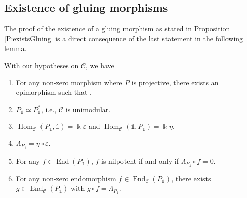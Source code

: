 \documentclass[pdftex]{sigma}
\numberwithin{equation}{section}
\newcommand{\tto}{\xrightarrow}
\numberwithin{theorem}{section}
\numberwithin{proposition}{section}
\numberwithin{definition}{section}
\numberwithin{lemma}{section}
\numberwithin{corollary}{section}
\numberwithin{remark}{section}
\numberwithin{example}{section}
\newcommand{\cat}{\mathcal{C}}
\newcommand{\End}{\operatorname{End}}
\newcommand{\Hom}{\operatorname{Hom}}
\newcommand{\unit}{\ensuremath{\mathds{1}}}
\newcommand{\FK}{{\Bbbk}}
\newcommand{\ve}{\varepsilon}
\newcommand{\wt}{\widetilde}
\begin{document}
\subsection{Existence of gluing morphisms} \label{ss:gluing}
The proof of the existence of a gluing morphism as stated in Proposition
\ref{P:existsGluing} is a direct consequence of the last statement in
the following lemma.

\begin{lemma}\label{L:prop-proj}\samepage
 With our
 hypotheses
 on $\cat$, we have
 \begin{enumerate}\itemsep=0pt
 \item[$1.$] For any non-zero morphism \smash{$P\tto f\unit$} where $P$ is
 projective, there exists
 an
 epimorphism \smash{$\wt f\colon P\to P_\unit$}
 such that
 \smash{$f=\ve\circ\wt f$}.
 \item[$2.$]
 $P_\unit\simeq P_\unit^*$, i.e., $\cat$ is unimodular.
 \item[$3.$] $\Hom_\cat(P_\unit,\unit)=\FK\ve$ and $\Hom_\cat(\unit,P_\unit)=\FK\eta$.
 \item[$4.$] $\Lambda_{P_\unit}=\eta\circ\ve$.
 \item[$5.$] For any $f\in\End(P_\unit)$, $f$ is nilpotent if and only if
 $\Lambda_{P_\unit}\circ f=0$.
 \item[$6.$] For any non-zero endomorphism $f\in \End_\cat(P_\unit)$, there exists
 $g\in \End_\cat(P_\unit)$ with $g\circ f=\Lambda_{P_\unit}$.
 \end{enumerate}
\end{lemma}
\end{document}
